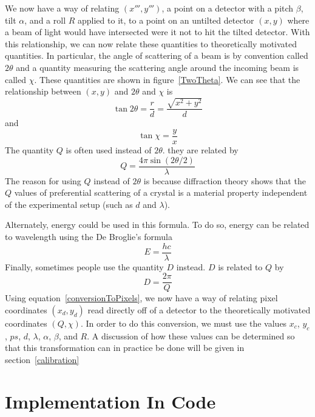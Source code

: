 We now have a way of relating $(x''',y''')$, 
a point on a detector with a pitch $\beta$, 
tilt $\alpha$, and a roll $R$ applied to it, 
to a point on an untilted detector $(x,y)$
where a beam of light would have intersected
were it not to hit the tilted detector.
With this relationship, we can now relate
these quantities to theoretically motivated 
quantities. In particular, the angle of scattering 
of a beam is by convention called $2\theta$ and a 
quantity measuring the scattering angle around the 
incoming beam is called $\chi$. These quantities 
are shown in figure~\ref{TwoTheta}. We can see that 
the relationship between $(x,y)$ and $2\theta$ and 
$\chi$ is
\begin{equation}\label{2thetatermsr}
    \tan2\theta = \frac{r}{d} = \frac{\sqrt{x^2+y^2}}{d}
\end{equation}
and
\begin{equation}\label{chitermsyx}
    \tan\chi = \frac{y}{x}
\end{equation}
The quantity $Q$ is often used instead of $2\theta$. 
they are related by
\begin{equation}\label{qterms2theta}
    Q = \frac{4\pi \sin(2\theta/2)}{\lambda}
\end{equation}
The reason for using $Q$ instead of $2\theta$ is because 
diffraction theory shows that the $Q$ values of preferential 
scattering of a crystal is a material property independent 
of the experimental setup (such as $d$ and $\lambda$). 

Alternately, energy could be used in this formula.
To do so, energy can be related to wavelength using
the De Broglie's formula
\begin{equation}
E = \frac{hc}{\lambda}
\end{equation}
Finally, sometimes people use the quantity $D$ instead.
$D$ is related to $Q$ by
\begin{equation}\label{DtermsQ}
    D = \frac{2\pi}{Q}
\end{equation}
Using equation~\ref{conversionToPixels},
we now have a way of relating pixel
coordinates $(x_d,y_d)$ read directly off
of a detector to the
theoretically motivated coordinates $(Q,\chi)$.
In order to do this conversion, we must use
the values $x_c$, $y_c$, $ps$, $d$, $\lambda$,
$\alpha$, $\beta$, and $R$. A discussion of
how these values can be determined so that
this transformation can in practice be done
will be given in section~\ref{calibration}


\section{Implementation In Code}

